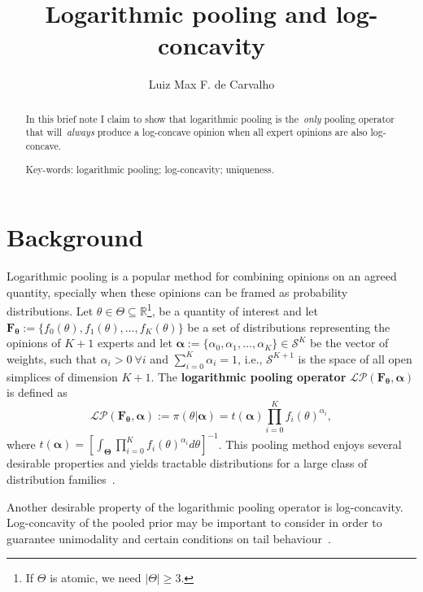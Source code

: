 \documentclass[a4paper, notitlepage, 10pt]{article}
\title{\vspace{-9ex}\centering \bf Logarithmic pooling and log-concavity}
\author{
Luiz Max F. de Carvalho\\
}
\begin{document}
\maketitle

\begin{abstract}
In this brief note I claim to show that logarithmic pooling is the~\textit{only} pooling operator that will~\textit{always} produce a log-concave opinion when all expert opinions are also log-concave.

Key-words: logarithmic pooling; log-concavity; uniqueness. 
\end{abstract}

\section*{Background}

Logarithmic pooling is a popular method for combining opinions on an agreed quantity, specially when these opinions can be framed as probability distributions.
Let $\theta \in \Theta \subseteq \mathbb{R}$\footnote{If $\Theta$ is atomic, we need $|\Theta| \geq 3$.}, be a quantity of interest and let $\mathbf{F_\theta} := \{f_0(\theta), f_1(\theta), \ldots, f_K(\theta)\}$ be a set of distributions representing the opinions of $K + 1$ experts and let $\boldsymbol\alpha :=\{\alpha_0, \alpha_1, \ldots, \alpha_K \} \in \mathcal{S}^K$ be the vector of weights, such that $\alpha_i > 0\: \forall i$ and $\sum_{i=0}^K \alpha_i = 1$, i.e., $\mathcal{S}^{K + 1}$ is the space of all open simplices of dimension $K + 1$.
The \textbf{logarithmic pooling operator} $\mathcal{LP}(\mathbf{F_\theta}, \boldsymbol\alpha)$ is defined as
\begin{equation}
\label{eq:logpool}
 \mathcal{LP}(\mathbf{F_\theta}, \boldsymbol\alpha) :=  \pi(\theta | \boldsymbol\alpha) = t(\boldsymbol\alpha) \prod_{i=0}^K f_i(\theta)^{\alpha_i},
\end{equation}
where $t(\boldsymbol\alpha) = \left[ \int_{\boldsymbol\Theta}\prod_{i=0}^K f_i(\theta)^{\alpha_i}d\theta \right]^{-1}$.
This pooling method enjoys several desirable properties and yields tractable distributions for a large class of distribution families~\citep{genest1984,genest1986A}.

Another desirable property of the logarithmic pooling operator is log-concavity.
Log-concavity of the pooled prior may be important to consider in order to guarantee unimodality and certain conditions on tail behaviour~\citep{Bagnoli2005}.
\end{document}
